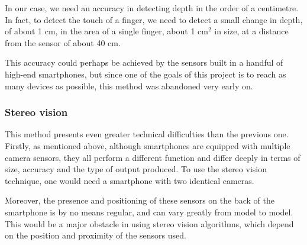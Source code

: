 In our case, we need an accuracy in detecting depth in the order of a centimetre.
In fact, to detect the touch of a finger, we need to detect a small change in depth, of about 1 cm,
in the area of a single finger, about 1 cm$^2$ in size, at a distance from the sensor of about 40 cm.

This accuracy could perhaps be achieved by the sensors built in a handful of high-end smartphones, but since
one of the goals of this project is to reach as many devices as possible, this method was abandoned very early on.

\subsubsection{Stereo vision}
This method presents even greater technical difficulties than the previous one.
Firstly, as mentioned above, although smartphones are equipped with multiple camera sensors,
they all perform a different function and differ deeply in terms of size, accuracy and the type of output produced.
To use the stereo vision technique, one would need a smartphone with two identical cameras.

Moreover, the presence and positioning of these sensors on the back of the smartphone is by no means regular,
and can vary greatly from model to model.
This would be a major obstacle in using stereo vision algorithms,
which depend on the position and proximity of the sensors used.

